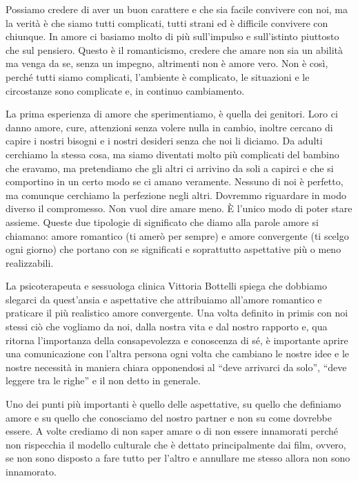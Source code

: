 \documentclass[12pt]{book} %
\begin{document}
Possiamo credere di aver un buon carattere e che sia facile convivere con noi, ma la verità è che siamo tutti
complicati, tutti strani ed è difficile convivere con chiunque. In amore ci basiamo molto di più sull'impulso e
sull'istinto piuttosto che sul pensiero. Questo è il romanticismo, credere che amare non sia un abilità ma venga da se,
senza un impegno, altrimenti non è amore vero. Non è così, perché tutti siamo complicati, l'ambiente è complicato, le
situazioni e le circostanze sono complicate e, in continuo cambiamento.

La prima esperienza di amore che sperimentiamo, è quella dei genitori. Loro ci danno amore, cure, attenzioni senza
volere nulla in cambio, inoltre cercano di capire i nostri bisogni e i nostri desideri senza che noi li diciamo. Da
adulti cerchiamo la stessa cosa, ma siamo diventati molto più complicati del bambino che eravamo, ma pretendiamo che
gli altri ci arrivino da soli a capirci e che si comportino in un certo modo se ci amano veramente. Nessuno di noi è
perfetto, ma comunque cerchiamo la perfezione negli altri. Dovremmo riguardare in modo diverso il compromesso. Non vuol
dire amare meno. È l'unico modo di poter stare assieme.\newline
\newline
Queste due tipologie di significato che diamo alla parole amore si chiamano: amore romantico (ti amerò per sempre) e
amore convergente (ti scelgo ogni giorno) che portano con se significati e soprattutto aspettative più o meno
realizzabili.

La psicoterapeuta e sessuologa clinica Vittoria Bottelli spiega che dobbiamo slegarci da
quest'ansia e aspettative che attribuiamo all'amore romantico e praticare il
più realistico amore convergente. Una volta definito in primis con noi stessi ciò che vogliamo da noi, dalla nostra
vita e dal nostro rapporto e, qua ritorna l'importanza della consapevolezza e conoscenza di sé, è
importante aprire una comunicazione con l'altra persona ogni volta che cambiano le nostre idee e
le nostre necessità in maniera chiara opponendosi al “deve arrivarci da solo”, “deve leggere tra le righe” e il non
detto in generale. 

Uno dei punti più importanti è quello delle aspettative, su quello che definiamo amore e su quello che conosciamo del
nostro partner e non su come dovrebbe
essere. A volte crediamo di non saper amare o di non essere innamorati perché non rispecchia il modello culturale che è
dettato principalmente dai film, ovvero, se non sono disposto a fare tutto per l'altro e annullare me stesso allora non
sono innamorato.
\end{document}
